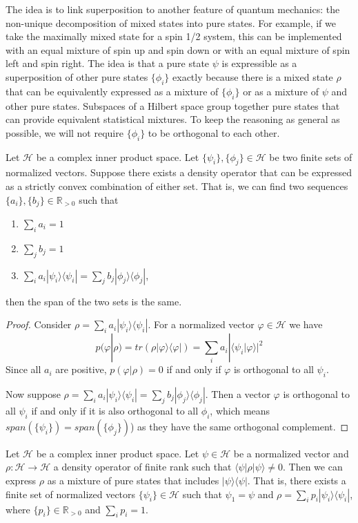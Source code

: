 \documentclass[10pt,twocolumn, nofootinbib]{revtex4-2}
\def\>{\rangle}
\def\<{\langle}
\begin{document}
The idea is to link superposition to another feature of quantum mechanics: the non-unique decomposition of mixed states into pure states. For example, if we take the maximally mixed state for a spin 1/2 system, this can be implemented with an equal mixture of spin up and spin down or with an equal mixture of spin left and spin right. The idea is that a pure state $\psi$ is expressible as a superposition of other pure states $\{\phi_i\}$ exactly because there is a mixed state $\rho$ that can be equivalently expressed as a mixture of $\{\phi_i\}$ or as a mixture of $\psi$ and other pure states. Subspaces of a Hilbert space group together pure states that can provide equivalent statistical mixtures. To keep the reasoning as general as possible, we will not require $\{\phi_i\}$ to be orthogonal to each other.

\begin{prop}\label{prop_densitySpan}
Let $\mathcal{H}$ be a complex inner product space. Let $\{\psi_i\}, \{\phi_j\} \in \mathcal{H}$ be two finite sets of normalized vectors. Suppose there exists a density operator that can be expressed as a strictly convex combination of either set. That is, we can find two sequences $\{a_i\}, \{b_j\} \in \mathbb{R}_{>0}$ such that
\begin{enumerate}
\item $\sum_i a_i = 1$
\item $\sum_j b_j = 1$
\item $\sum_i a_i |\psi_i\>\<\psi_i| = \sum_j b_j |\phi_j\>\<\phi_j|$,
\end{enumerate}
then the span of the two sets is the same.
\end{prop}

\begin{proof}
Consider $\rho = \sum_i a_i |\psi_i\>\<\psi_i|$. For a normalized vector $\varphi \in \mathcal{H}$ we have
$$p(\varphi|\rho)=tr(\rho |\varphi\>\<\varphi|) = \sum_i a_i |\<\psi_i|\varphi\>|^2$$
Since all $a_i$ are positive, $p(\varphi|\rho) = 0$ if and only if $\varphi$ is orthogonal to all $\psi_i$.

Now suppose $\rho = \sum_i a_i |\psi_i\>\<\psi_i| = \sum_j b_j |\phi_j\>\<\phi_j|$. Then a vector $\varphi$ is orthogonal to all $\psi_i$ if and only if it is also orthogonal to all $\phi_i$, which means $span(\{\psi_i\}) = span(\{\phi_j\})$) as they have the same orthogonal complement.
\end{proof}

\begin{prop}\label{prop_decomposition}
Let $\mathcal{H}$ be a complex inner product space. Let $\psi \in \mathcal{H}$ be a normalized vector and $\rho : \mathcal{H} \to \mathcal{H}$ a density operator of finite rank such that $\<\psi|\rho|\psi\>\neq 0$. Then we can express $\rho$ as a mixture of pure states that includes $|\psi\>\<\psi|$. That is, there exists a finite set of normalized vectors $\{\psi_i\} \in \mathcal{H}$ such that $\psi_1 = \psi$ and $\rho = \sum_i p_i |\psi_i\>\<\psi_i|$, where $\{p_i\} \in \mathbb{R}_{>0}$ and $\sum_i p_i = 1$.
\end{prop}
\end{document}
